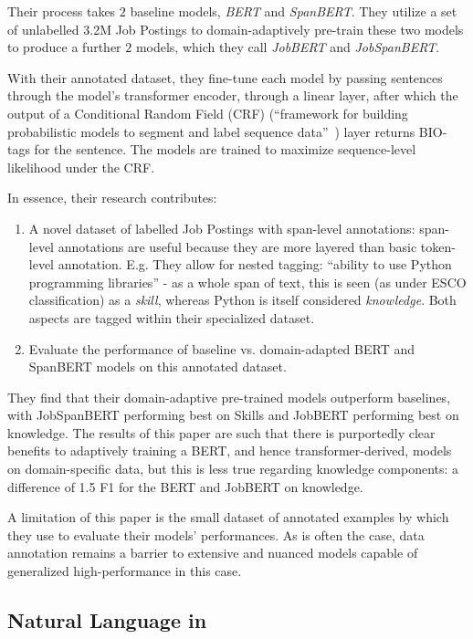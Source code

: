 Their process takes $2$ baseline models, \emph{BERT} and \emph{SpanBERT}. They utilize a set of unlabelled 3.2M Job Postings to domain-adaptively pre-train these two models to produce a further $2$ models, which they call \emph{JobBERT} and \emph{JobSpanBERT}.

With their annotated dataset, they fine-tune each model by passing sentences through the model's transformer encoder, through a linear layer, after which the output of a Conditional Random Field (CRF) (``framework for building probabilistic models to segment and label sequence data''~\cite{lafferty__ConditionalRandom}) layer returns BIO-tags for the sentence.
The models are trained to maximize sequence-level likelihood under the CRF.

In essence, their research contributes:
\begin{enumerate}
  \item A novel dataset of labelled Job Postings with span-level annotations: span-level annotations are useful because they are more layered than basic token-level annotation. E.g. They allow for nested tagging: ``ability to use Python programming libraries'' - as a whole span of text, this is seen (as under ESCO classification) as a \emph{skill}, whereas Python is itself considered \emph{knowledge}. Both aspects are tagged within their specialized dataset.
  \item Evaluate the performance of baseline vs. domain-adapted BERT and SpanBERT models on this annotated dataset.
\end{enumerate}

They find that their domain-adaptive pre-trained models outperform baselines, with JobSpanBERT performing best on Skills and JobBERT performing best on knowledge.
The results of this paper are such that there is purportedly clear benefits to adaptively training a BERT, and hence transformer-derived, models on domain-specific data, but this is less true regarding knowledge components: a difference of 1.5 F1 for the BERT and JobBERT on knowledge.

A limitation of this paper is the small dataset of annotated examples by which they use to evaluate their models' performances.
As is often the case, data annotation remains a barrier to extensive and nuanced models capable of generalized high-performance in this case.

\subsection{Natural Language in \ghrepo{}}

